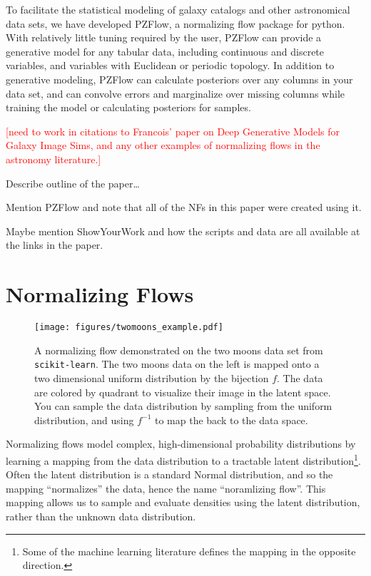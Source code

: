 \documentclass[twocolumn]{aastex631}
\newcommand{\note}[1]{\textsf{\textcolor{red}{#1}}}
\begin{document}
To facilitate the statistical modeling of galaxy catalogs and other astronomical data sets, we have developed PZFlow, a normalizing flow package for python.
With relatively little tuning required by the user, PZFlow can provide a generative model for any tabular data, including continuous and discrete variables, and variables with Euclidean or periodic topology.
In addition to generative modeling, PZFlow can calculate posteriors over any columns in your data set, and can convolve errors and marginalize over missing columns while training the model or calculating posteriors for samples.

\note{[need to work in citations to Francois' paper on Deep Generative Models for Galaxy Image Sims, and any other examples of normalizing flows in the astronomy literature.]}

Describe outline of the paper\dots

Mention PZFlow and note that all of the NFs in this paper were created using it.

Maybe mention ShowYourWork and how the scripts and data are all available at the links in the paper.


\section{Normalizing Flows}
\label{sec:nf}

\begin{figure*}[t!]
    \begin{centering}
        \texttt{[image: figures/twomoons\_example.pdf]}
        \caption{
            A normalizing flow demonstrated on the two moons data set from \texttt{scikit-learn}.
            The two moons data on the left is mapped onto a two dimensional uniform distribution by the bijection $f$.
            The data are colored by quadrant to visualize their image in the latent space.
            You can sample the data distribution by sampling from the uniform distribution, and using $f^{-1}$ to map the back to the data space.
        }
        \label{fig:two-moons}
    \end{centering}
\end{figure*}

Normalizing flows model complex, high-dimensional probability distributions by learning a mapping from the data distribution to a tractable latent distribution\footnote{Some of the machine learning literature defines the mapping in the opposite direction.}.
Often the latent distribution is a standard Normal distribution, and so the mapping ``normalizes'' the data, hence the name ``noramlizing flow''.
This mapping allows us to sample and evaluate densities using the latent distribution, rather than the unknown data distribution.
\end{document}
